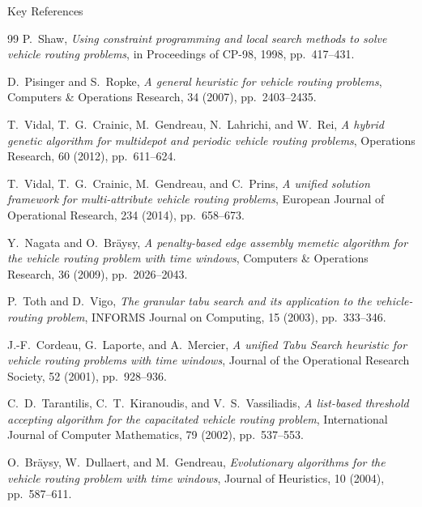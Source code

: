\documentclass[aspectratio=169,10pt]{beamer}
\begin{document}
\begin{frame}[allowframebreaks]{Key References}
\begin{thebibliography}{99}
    P.\ Shaw,
    \emph{Using constraint programming and local search methods to
      solve vehicle routing problems},
    in Proceedings of CP-98, 1998, pp.\ 417--431.

    D.\ Pisinger and S.\ Ropke,
    \emph{A general heuristic for vehicle routing problems},
    Computers \& Operations Research, 34 (2007), pp.\ 2403--2435.

    T.\ Vidal, T.\ G.\ Crainic, M.\ Gendreau, N.\ Lahrichi, and W.\ Rei,
    \emph{A hybrid genetic algorithm for multidepot and periodic vehicle
      routing problems},
    Operations Research, 60 (2012), pp.\ 611--624.

    T.\ Vidal, T.\ G.\ Crainic, M.\ Gendreau, and C.\ Prins,
    \emph{A unified solution framework for multi-attribute vehicle routing
      problems},
    European Journal of Operational Research, 234 (2014), pp.\ 658--673.

    Y.\ Nagata and O.\ Br\"aysy,
    \emph{A penalty-based edge assembly memetic algorithm for the vehicle
      routing problem with time windows},
    Computers \& Operations Research, 36 (2009), pp.\ 2026--2043.

    P.\ Toth and D.\ Vigo,
    \emph{The granular tabu search and its application to the
      vehicle-routing problem},
    INFORMS Journal on Computing, 15 (2003), pp.\ 333--346.

    J.-F.\ Cordeau, G.\ Laporte, and A.\ Mercier,
    \emph{A unified Tabu Search heuristic for vehicle routing problems
      with time windows},
    Journal of the Operational Research Society, 52 (2001), pp.\ 928--936.

    C.\ D.\ Tarantilis, C.\ T.\ Kiranoudis, and V.\ S.\ Vassiliadis,
    \emph{A list-based threshold accepting algorithm for the capacitated
      vehicle routing problem},
    International Journal of Computer Mathematics, 79 (2002), pp.\ 537--553.

    O.\ Br\"aysy, W.\ Dullaert, and M.\ Gendreau,
    \emph{Evolutionary algorithms for the vehicle routing problem with
      time windows},
    Journal of Heuristics, 10 (2004), pp.\ 587--611.

  \end{thebibliography}

\end{frame}
\end{document}
